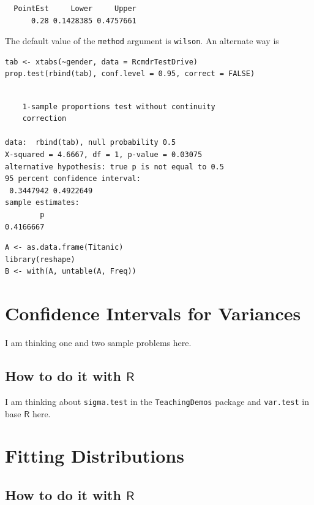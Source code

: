 \documentclass[captions=tableheading]{scrbook}
\begin{document}
\begin{verbatim}
  PointEst     Lower     Upper
      0.28 0.1428385 0.4757661
\end{verbatim}

The default value of the \texttt{method} argument is \texttt{wilson}.  An alternate way is 



\lstset{language=R}
\begin{lstlisting}
tab <- xtabs(~gender, data = RcmdrTestDrive)
prop.test(rbind(tab), conf.level = 0.95, correct = FALSE)
\end{lstlisting}


\begin{verbatim}

	1-sample proportions test without continuity
	correction

data:  rbind(tab), null probability 0.5 
X-squared = 4.6667, df = 1, p-value = 0.03075
alternative hypothesis: true p is not equal to 0.5 
95 percent confidence interval:
 0.3447942 0.4922649 
sample estimates:
        p 
0.4166667
\end{verbatim}


\lstset{language=R}
\begin{lstlisting}
A <- as.data.frame(Titanic)
library(reshape)
B <- with(A, untable(A, Freq))
\end{lstlisting}
\section{Confidence Intervals for Variances}
\label{sec-9-5}
\label{sec-Confidence-Intervals-for-Variances}


I am thinking one and two sample problems here.
\subsection{How to do it with \(\mathsf{R}\)}
\label{sec-9-5-1}


I am thinking about \texttt{sigma.test} in the \texttt{TeachingDemos} package and \texttt{var.test} in base \(\mathsf{R}\) here.
\section{Fitting Distributions}
\label{sec-9-6}
\label{sec-Fitting-Distributions}
\subsection{How to do it with \(\mathsf{R}\)}
\label{sec-9-6-1}
\end{document}
